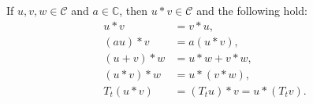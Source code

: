 If $u, v, w \in \mathcal{C}$ and $a \in \mathbb{C}$, then $u * v \in \mathcal{C}$ and the following hold:
\begin{align}
u * v &= v * u, \\
(au) * v &= a(u * v), \\
(u + v) * w &= u * w + v * w, \\
(u * v) * w &= u * (v * w), \\
T_t(u * v) &= (T_t u) * v = u * (T_t v).
\end{align}
